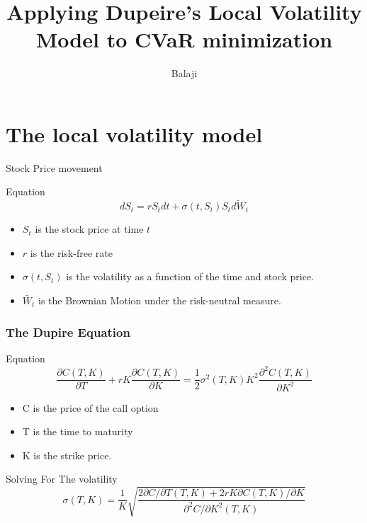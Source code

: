 \documentclass{beamer}
\title{Applying Dupeire's Local Volatility Model to CVaR minimization}
\author{Balaji}
\date{}
\institute{IISc Bangalore}
\begin{document}
\maketitle
\section{The local volatility model}
\begin{frame}{Stock Price movement}
    \begin{lol}{Equation}
        \begin{equation}
            dS_t = rS_t dt + \sigma(t,S_t)S_t\tilde{dW_t}
        \end{equation}
    \end{lol}
    
    \begin{itemize}
        \item $S_t$ is the stock price at time $t$
        \item $r$ is the risk-free rate
        \item $\sigma(t,S_t)$ is the volatility as a function of the time and stock price.
        \item $\tilde{W_t}$ is the Brownian Motion under the risk-neutral measure.
    \end{itemize}
    
\end{frame}
\begin{frame}
    \frametitle{The Dupire Equation}
    \begin{lol}{Equation}
        \begin{equation}
            \frac{\partial C(T,K)}{\partial T}  + rK\frac{\partial C(T,K)}{\partial K}  = \frac{1}{2}\sigma^2(T,K)K^2\frac{\partial^2 C(T,K)}{\partial K^2}
        \end{equation}
    \end{lol}
    \begin{itemize}
        \item C is the price of the call option
        \item T is the time to maturity
        \item K is the strike price.
    \end{itemize}
    \begin{lol}{Solving For The volatility}
        \begin{equation}
            \sigma(T,K) = \frac{1}{K} \sqrt{\frac{2\partial C/\partial T(T,K) + 2rK\partial C(T,K)/\partial K}{\partial^2C/\partial K^2(T,K)}}
        \end{equation}
    \end{lol}
\end{frame}
\end{document}
